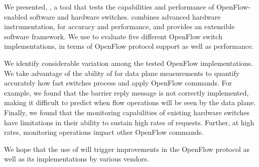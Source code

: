We presented, \oflops, a tool that tests the capabilities and performance of 
OpenFlow-enabled software and hardware switches. \oflops combines advanced 
hardware instrumentation, for accuracy and performance, and provides an extensible 
software framework. We use \oflops to evaluate five different OpenFlow switch 
implementations, in terms of OpenFlow protocol support as well as performance.

We identify considerable variation among the tested OpenFlow implementations.
We take advantage of the ability of \oflops for data plane measurements to
quantify accurately how fast switches process and apply OpenFlow commands.
For example, we found that the barrier reply message is not correctly implemented,
making it difficult to predict when flow operations will be seen by the data plane.
Finally, we found that the monitoring capabilities of existing hardware switches 
have limitations in their ability to sustain high rates of requests. Further, at high 
rates, monitoring operations impact other OpenFlow commands.

We hope that the use of \oflops will trigger improvements in the
OpenFlow protocol as well as its implementations by various vendors.



